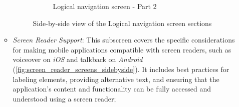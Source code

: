 \begin{enumerate}
\begin{itemize}
\begin{figure}[ht]
\begin{subfigure}[b]{0.48\textwidth}
                \caption{Logical navigation screen - Part 2}
                \label{fig:logical-right}
            \end{subfigure}
            \caption{Side-by-side view of the Logical navigation screen sections}
            \label{fig:logical_screens_sidebyside}
        \end{figure}

        \FloatBarrier

        \item \textit{Screen Reader Support}: This subscreen covers the specific considerations for making mobile applications compatible with screen readers, such as \gls{voiceover} on \textit{iOS} and \gls{talkback} on \textit{Android} (\ref{fig:screen_reader_screens_sidebyside}). It includes best practices for labeling elements, providing alternative text, and ensuring that the application's content and functionality can be fully accessed and understood using a screen reader;


\end{itemize}
\end{enumerate}
